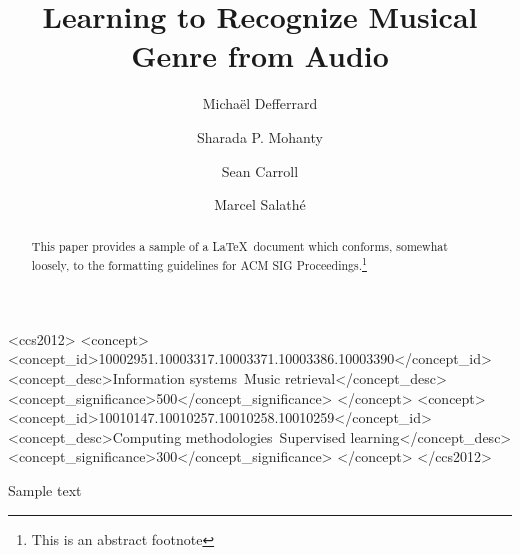\documentclass[sigconf]{acmart}
\begin{document}
\title{Learning to Recognize Musical Genre from Audio}


\author{Michaël Defferrard}

\author{Sharada P. Mohanty}

\author{Sean Carroll}

\author{Marcel Salathé}



\begin{abstract}
This paper provides a sample of a \LaTeX\ document which conforms,
somewhat loosely, to the formatting guidelines for
ACM SIG Proceedings.\footnote{This is an abstract footnote}
\end{abstract}


 \begin{CCSXML}
<ccs2012>
  <concept>
    <concept_id>10002951.10003317.10003371.10003386.10003390</concept_id>
    <concept_desc>Information systems~Music retrieval</concept_desc>
    <concept_significance>500</concept_significance>
  </concept>
  <concept>
    <concept_id>10010147.10010257.10010258.10010259</concept_id>
    <concept_desc>Computing methodologies~Supervised learning</concept_desc>
    <concept_significance>300</concept_significance>
  </concept>
</ccs2012>
\end{CCSXML}



\maketitle

Sample text



\end{document}
